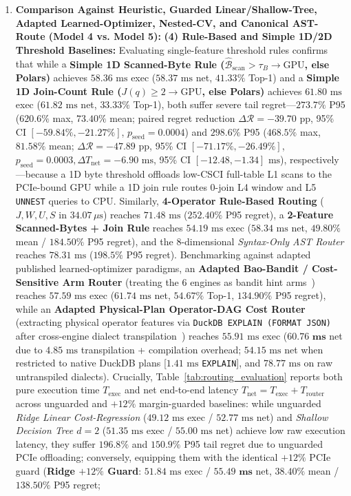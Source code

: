 \documentclass[10pt,a4paper]{article}
\begin{document}
\begin{enumerate}[leftmargin=1.5em,itemsep=0.8pt]
    \item \textbf{Comparison Against Heuristic, Guarded Linear/Shallow-Tree, Adapted Learned-Optimizer, Nested-CV, and Canonical AST-Route (Model 4 vs. Model 5):} \textbf{(4) Rule-Based and Simple 1D/2D Threshold Baselines:} Evaluating single-feature threshold rules confirms that while a \textbf{Simple 1D Scanned-Byte Rule ($\hat{\mathcal{B}}_{\text{scan}} > \tau_B \rightarrow \text{GPU}$, else Polars)} achieves $58.36\text{ ms}$ exec ($58.37\text{ ms}$ net, $41.33\%$ Top-1) and a \textbf{Simple 1D Join-Count Rule ($J(q) \ge 2 \rightarrow \text{GPU}$, else Polars)} achieves $61.80\text{ ms}$ exec ($61.82\text{ ms}$ net, $33.33\%$ Top-1), both suffer severe tail regret---$\mathbf{273.7\%}$ P95 ($\mathbf{620.6\%}$ max, $73.40\%$ mean; paired regret reduction $\Delta\mathcal{R} = -39.70\text{ pp}$, 95\% CI $[-59.84\%, -21.27\%]$, $p_{\text{seed}}=0.0004$) and $\mathbf{298.6\%}$ P95 ($\mathbf{468.5\%}$ max, $81.58\%$ mean; $\Delta\mathcal{R} = -47.89\text{ pp}$, 95\% CI $[-71.17\%, -26.49\%]$, $p_{\text{seed}}=0.0003, \Delta T_{\text{net}}=-6.90\text{ ms}$, 95\% CI $[-12.48,-1.34]\text{ ms}$), respectively---because a 1D byte threshold offloads low-CSCI full-table L1 scans to the PCIe-bound GPU while a 1D join rule routes 0-join L4 window and L5 \texttt{UNNEST} queries to CPU. Similarly, \textbf{4-Operator Rule-Based Routing} ($J, W, U, S$ in $34.07\,\mu\text{s}$) reaches $71.48\text{ ms}$ ($252.40\%$ P95 regret), a \textbf{2-Feature Scanned-Bytes + Join Rule} reaches $54.19\text{ ms}$ exec ($58.34\text{ ms}$ net, $49.80\%$ mean / $184.50\%$ P95 regret), and the 8-dimensional \emph{Syntax-Only AST Router} reaches $78.31\text{ ms}$ ($198.5\%$ P95 regret). Benchmarking against adapted published learned-optimizer paradigms, an \textbf{Adapted Bao-Bandit / Cost-Sensitive Arm Router} (treating the 6 engines as bandit hint arms~\cite{marcus2021bao}) reaches $57.59\text{ ms}$ exec ($61.74\text{ ms}$ net, $54.67\%$ Top-1, $134.90\%$ P95 regret), while an \textbf{Adapted Physical-Plan Operator-DAG Cost Router} (extracting physical operator features via \texttt{DuckDB EXPLAIN (FORMAT JSON)} after cross-engine dialect transpilation~\cite{hilprecht2022zeroshot}) reaches $55.91\text{ ms}$ exec ($\mathbf{60.76\text{ ms}}$ net due to $4.85\text{ ms}$ transpilation + compilation overhead; $54.15\text{ ms}$ net when restricted to native DuckDB plans [$1.41\text{ ms}$ \texttt{EXPLAIN}], and $78.77\text{ ms}$ on raw untranspiled dialects). Crucially, Table~\ref{tab:routing_evaluation} reports both pure execution time $T_{\text{exec}}$ and net end-to-end latency $T_{\text{net}} = T_{\text{exec}} + T_{\text{router}}$ across unguarded and $+12\%$ margin-guarded baselines: while unguarded \emph{Ridge Linear Cost-Regression} ($49.12\text{ ms}$ exec / $52.77\text{ ms}$ net) and \emph{Shallow Decision Tree $d=2$} ($51.35\text{ ms}$ exec / $55.00\text{ ms}$ net) achieve low raw execution latency, they suffer $\mathbf{196.8\%}$ and $\mathbf{150.9\%}$ P95 tail regret due to unguarded PCIe offloading; conversely, equipping them with the identical $+12\%$ PCIe guard (\textbf{Ridge $+12\%$ Guard}: $51.84\text{ ms}$ exec / $\mathbf{55.49\text{ ms}}$ net, $38.40\%$ mean / $138.50\%$ P95 regret; 
\end{enumerate}
\end{document}
